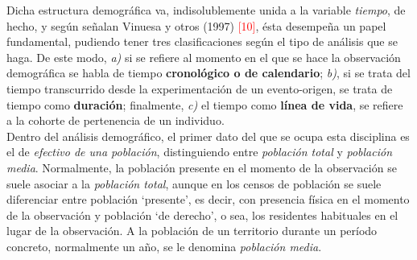 \begin{center}
\end{center}

Dicha estructura demogr\'afica va, indisolublemente unida a la variable \textit{tiempo}, de hecho, y seg\'un se\~nalan Vinuesa y otros (1997) \textcolor{red}{[10]}, \'esta desempe\~na un papel fundamental, pudiendo tener tres clasificaciones seg\'un el tipo de an\'alisis que se haga. De este modo, \textit{a)} si se refiere al momento en el que se hace la observaci\'on demogr\'afica se habla de tiempo \textbf{cronol\'ogico o de calendario}; \textit{b)}, si se trata del tiempo transcurrido desde la experimentaci\'on de un evento-origen, se trata de tiempo como \textbf{duraci\'on}; finalmente, \textit{c)} el tiempo como \textbf{l\'inea de vida}, se refiere a la cohorte de pertenencia de un individuo.\\

Dentro del an\'alisis demogr\'afico, el primer dato del que se ocupa esta disciplina es el de \textit{efectivo de una poblaci\'on}, distinguiendo entre \textit{poblaci\'on total} y \textit{poblaci\'on media}. Normalmente, la poblaci\'on presente en el momento de la observaci\'on se suele asociar a la \textit{poblaci\'on total}, aunque en los censos de poblaci\'on se suele diferenciar entre poblaci\'on `presente', es decir, con presencia f\'isica en el momento de la observaci\'on y poblaci\'on `de derecho', o sea, los residentes habituales en el lugar de la observaci\'on. A la poblaci\'on de un territorio durante un per\'iodo concreto, normalmente un a\~no, se le denomina \textit{poblaci\'on media}.\\


